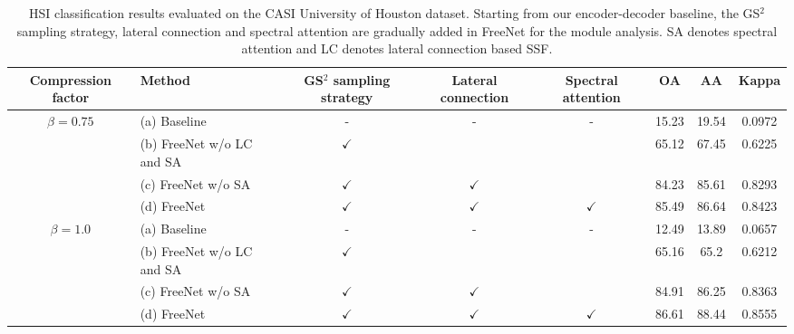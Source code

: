 \documentclass[journal]{IEEEtran}
\begin{document}
\begin{table*}[ht]
  \caption{
    HSI classification results evaluated on the CASI University of Houston dataset. Starting from our encoder-decoder baseline, the GS$^2$ sampling strategy, lateral connection and spectral attention are gradually added in FreeNet for the module analysis.
    SA denotes spectral attention and LC denotes lateral connection based SSF.
    \label{tab:ablation_study}}
  \centering
  \renewcommand{\arraystretch}{1.5}
  \begin{tabular}{c|l|ccc|ccc}
    \hline
    Compression factor            & Method                    & GS$^2$ sampling strategy & Lateral connection & Spectral attention & OA    & AA    & Kappa  \\ \hline
    \multirow{4}{*}{$\beta=0.75$} & (a) Baseline              & -                        & -                  & -                  & 15.23 & 19.54 & 0.0972 \\ \cline{2-8}
                                  & (b) FreeNet w/o LC and SA & $\checkmark$             &                    &                    & 65.12 & 67.45 & 0.6225 \\
                                  & (c) FreeNet w/o SA        & $\checkmark$             & $\checkmark$       &                    & 84.23 & 85.61 & 0.8293 \\
                                  & (d) FreeNet               & $\checkmark$             & $\checkmark$       & $\checkmark$       & 85.49 & 86.64 & 0.8423 \\ \hline
    \multirow{4}{*}{$\beta=1.0$}  & (a) Baseline              & -                        & -                  & -                  & 12.49 & 13.89 & 0.0657 \\ \cline{2-8}
                                  & (b) FreeNet w/o LC and SA & $\checkmark$             &                    &                    & 65.16 & 65.2  & 0.6212 \\
                                  & (c) FreeNet w/o SA        & $\checkmark$             & $\checkmark$       &                    & 84.91 & 86.25 & 0.8363 \\
                                  & (d) FreeNet               & $\checkmark$             & $\checkmark$       & $\checkmark$       & 86.61 & 88.44 & 0.8555 \\ \hline
  \end{tabular}
\end{table*}
\end{document}
